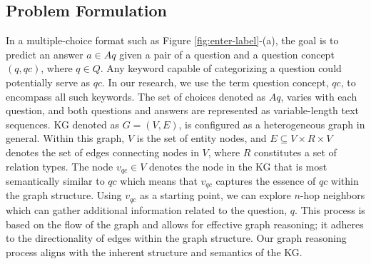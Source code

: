 \documentclass{article}
\begin{document}


\subsection{Problem Formulation} \label{3_1} 
 In a multiple-choice format such as Figure \ref{fig:enter-label}-(a), the goal is to predict an answer $a \in Aq$ given a pair of a question and a question concept $(q, qc)$, where $q \in Q$. Any keyword capable of categorizing a question could potentially serve as $qc$. In our research, we use the term question concept, $qc$, to encompass all such keywords. The set of choices denoted as $Aq$, varies with each question, and both questions and answers are represented as variable-length text sequences. KG denoted as $G=(V,E)$, is configured as a heterogeneous graph in general. Within this graph, $V$ is the set of entity nodes, and $E \subseteq V \times R \times V$ denotes the set of edges connecting nodes in $V$, where $R$ constitutes a set of relation types. The node $v_{qc} \in V$ denotes the node in the KG that is most semantically similar to $qc$ which means that $v_{qc}$ captures the essence of $qc$ within the graph structure. Using $v_{qc}$ as a starting point, we can explore $n$-hop neighbors which can gather additional information related to the question, $q$. This process is based on the flow of the graph and allows for effective graph reasoning; it adheres to the directionality of edges within the graph structure. Our graph reasoning process aligns with the inherent structure and semantics of the KG.
  
 
\end{document}
